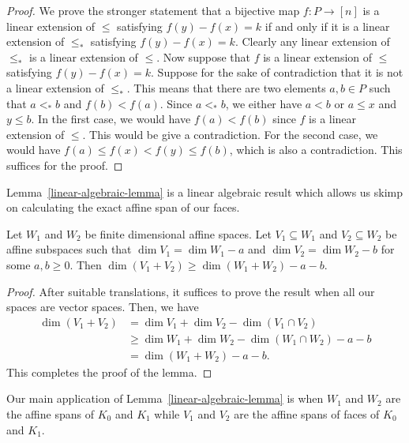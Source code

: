 \documentclass{puthesis-UG}
\begin{document}
\begin{proof}
    We prove the stronger statement that a bijective map $f : P \to [n]$ is a linear extension of $\leq$ satisfying $f(y) - f(x) = k$ if and only if it is a linear extension of $\leq_*$ satisfying $f(y) - f(x) = k$. Clearly any linear extension of $\leq_*$ is a linear extension of $\leq$. Now suppose that $f$ is a linear extension of $\leq$ satisfying $f(y) - f(x) = k$. Suppose for the sake of contradiction that it is not a linear extension of $\leq_*$. This means that there are two elements $a, b \in P$ such that $a <_* b$ and $f(b) < f(a)$. Since $a <_* b$, we either have $a < b$ or $a \leq x$ and $y \leq b$. In the first case, we would have $f(a) < f(b)$ since $f$ is a linear extension of $\leq$. This would be give a contradiction. For the second case, we would have $f(a) \leq f(x) < f(y)\leq f(b)$, which is also a contradiction. This suffices for the proof. 
\end{proof}

Lemma~\ref{linear-algebraic-lemma} is a linear algebraic result which allows us skimp on calculating the exact affine span of our faces. 

\begin{lem} \label{linear-algebraic-lemma}
    Let $W_1$ and $W_2$ be finite dimensional affine spaces. Let $V_1 \subseteq W_1$ and $V_2 \subseteq W_2$ be affine subspaces such that $\dim V_1 = \dim W_1 - a$ and $\dim V_2 = \dim W_2 - b$ for some $a, b \geq 0$. Then $\dim (V_1 + V_2) \geq \dim (W_1 + W_2) - a - b$. 
\end{lem}

\begin{proof}
    After suitable translations, it suffices to prove the result when all our spaces are vector spaces. Then, we have 
    \begin{align*}
        \dim (V_1 + V_2) & = \dim V_1 + \dim V_2 - \dim (V_1 \cap V_2) \\
        & \geq \dim W_1 + \dim W_2 - \dim (W_1 \cap W_2) - a - b \\
        & = \dim (W_1 + W_2) - a - b. 
    \end{align*}
    This completes the proof of the lemma. 
\end{proof}

Our main application of Lemma~\ref{linear-algebraic-lemma} is when $W_1$ and $W_2$ are the affine spans of $K_0$ and $K_1$ while $V_1$ and $V_2$ are the affine spans of faces of $K_0$ and $K_1$. 



\end{document}
